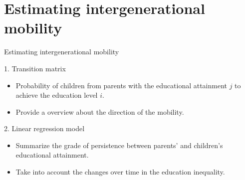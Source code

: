 \documentclass{beamer}
\begin{document}
\section{Estimating intergenerational mobility}

\begin{frame} {Estimating intergenerational mobility}
\begin{block}{1. Transition matrix}
\begin{itemize}
\item \footnotesize Probability of children from parents with the educational attainment $j$ to achieve the education level $i$.
\item \footnotesize Provide a overview about the direction of the mobility.
\end{itemize}
\end{block}
\hfill \break 
\begin{block}{2. Linear regression model}
\begin{itemize}
\item \footnotesize Summarize the grade of persistence between parents' and children's educational attainment.
\item \footnotesize Take into account the changes over time in the education inequality.
\end{itemize}
\end{block}
\end{frame}


\newcommand{\seti}{\setcounter{saveenumi}{\value{enumi}}}
\newcommand{\conti}{\setcounter{enumi}{\value{saveenumi}}}
\end{document}

